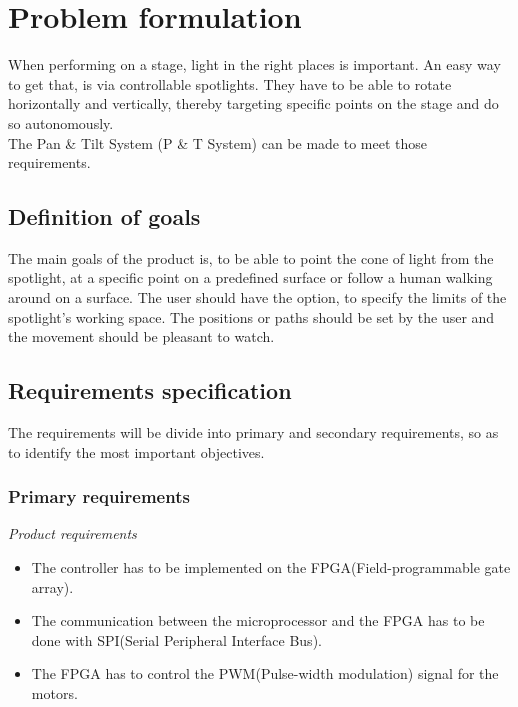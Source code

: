 \newpage

\section{Problem formulation}

When performing on a stage, light in the right places is important. An easy way to get that, is via controllable spotlights. They have to be able to rotate horizontally and vertically, thereby targeting specific points on the stage and do so autonomously.\\
The Pan \& Tilt System (P \& T System) can be made to meet those requirements.


\subsection{Definition of goals}
The main goals of the product is, to be able to point the cone of light from the spotlight, at a specific point on a predefined surface or follow a human walking around on a surface. The user should have the option, to specify the limits of the spotlight's working space. The positions or paths should be set by the user and the movement should be pleasant to watch.


\subsection{Requirements specification}
\label{sec:RequirementsSpecification}

The requirements will be divide into primary and secondary requirements, so as to identify the most important objectives.


\subsubsection{Primary requirements}

\textit{Product requirements}

\begin{itemize}

\item The controller has to be implemented on the FPGA(Field-programmable gate array).

\item The communication between the microprocessor and the FPGA has to be done with SPI(Serial Peripheral Interface Bus).

\item The FPGA has to control the PWM(Pulse-width modulation) signal for the motors.
\end{itemize}

